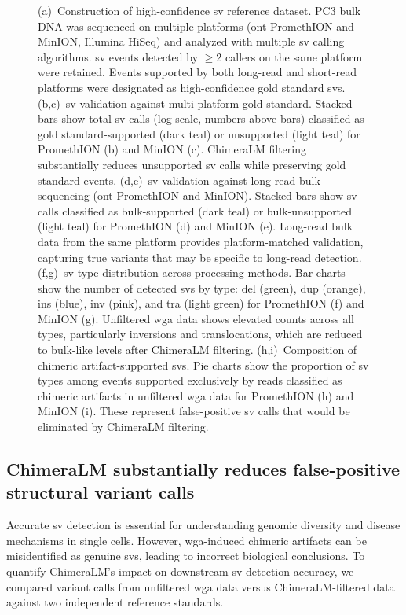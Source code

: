 \documentclass[pdflatex,sn-nature,lineno]{sn-jnl}%
\theoremstyle{thmstyleone}%
\theoremstyle{thmstyletwo}%
\theoremstyle{thmstylethree}%
\begin{document}
\begin{figure}[H]
{		(a)~Construction of high-confidence \gls{sv} reference dataset. PC3 bulk DNA was sequenced on multiple platforms (\gls{ont} PromethION and MinION, Illumina HiSeq) and analyzed with multiple \gls{sv} calling algorithms. \gls{sv} events detected by $\geq$2 callers on the same platform were retained. Events supported by both long-read and short-read platforms were designated as high-confidence gold standard \glspl{sv}.
		(b,c)~\gls{sv} validation against multi-platform gold standard. Stacked bars show total \gls{sv} calls (log scale, numbers above bars) classified as gold standard-supported (dark teal) or unsupported (light teal) for PromethION (b) and MinION (c). ChimeraLM filtering substantially reduces unsupported \gls{sv} calls while preserving gold standard events.
		(d,e)~\gls{sv} validation against long-read bulk sequencing (\gls{ont} PromethION and MinION). Stacked bars show \gls{sv} calls classified as bulk-supported (dark teal) or bulk-unsupported (light teal) for PromethION (d) and MinION (e). Long-read bulk data from the same platform provides platform-matched validation, capturing true variants that may be specific to long-read detection.
		(f,g)~\gls{sv} type distribution across processing methods. Bar charts show the number of detected \glspl{sv} by type: \gls{del} (green), \gls{dup} (orange), \gls{ins} (blue), \gls{inv} (pink), and \gls{tra} (light green) for PromethION (f) and MinION (g). Unfiltered \gls{wga} data shows elevated counts across all types, particularly inversions and translocations, which are reduced to bulk-like levels after ChimeraLM filtering.
		(h,i)~Composition of chimeric artifact-supported \glspl{sv}. Pie charts show the proportion of \gls{sv} types among events supported exclusively by reads classified as chimeric artifacts in unfiltered \gls{wga} data for PromethION (h) and MinION (i). These represent false-positive \gls{sv} calls that would be eliminated by ChimeraLM filtering.
	}\label{fig:figure3}
\end{figure}


\subsection*{ChimeraLM substantially reduces false-positive structural variant calls}

Accurate \gls{sv} detection is essential for understanding genomic diversity and disease mechanisms in single cells.
However, \gls{wga}-induced chimeric artifacts can be misidentified as genuine \glspl{sv}, leading to incorrect biological conclusions.
To quantify ChimeraLM's impact on downstream \gls{sv} detection accuracy, we compared variant calls from unfiltered \gls{wga} data versus ChimeraLM-filtered data against two independent reference standards.
\end{document}
